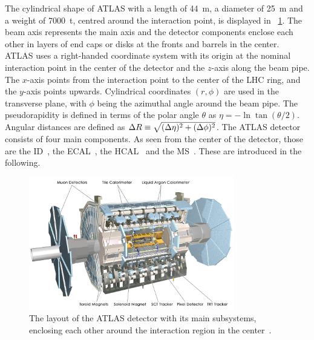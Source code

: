 %
The cylindrical shape of \gls{ATLAS} with a length of 44~m, a diameter of 25~m and a weight of 7000~t, centred around the interaction point, is displayed in \fig~\ref{fig:ATLASlayout}. The beam axis represents the main axis and the detector components enclose each other in layers of end caps or disks at the fronts and barrels in the center. 
%
\gls{ATLAS} uses a right-handed coordinate system with its origin at the nominal interaction point in the center of the detector and the $z$-axis along the beam pipe. The $x$-axis points from the interaction point to the center of the \gls{LHC} ring, and the $y$-axis points upwards.  Cylindrical coordinates $(r,\phi)$ are used in the transverse plane, with $\phi$ being the azimuthal angle around the beam pipe.  The pseudorapidity is defined in terms of the polar angle $\theta$ as $\eta = -\ln \tan(\theta/2)$.  Angular distances are defined as $\Delta R \equiv \sqrt{(\Delta\eta)^{2} + (\Delta\phi)^{2}}$.
%
The \gls{ATLAS} detector consists of four main components. As seen from the center of the detector, those are the \gls{ID}~\cite{idtdr1,idtdr2}, the \gls{ECAL}~\cite{calo,LAr}, the \gls{HCAL}~\cite{calo,Tile} and the \gls{MS}~\cite{muon1,muon2}. These are introduced in the following.
%
%
\begin{figure}[tbp!]
\centering
\includegraphics[width=0.8\textwidth]{./figs/ATLAS_full_detector.jpg}
\hfill
\caption[Layout of the \gls{ATLAS} detector]{
%
The layout of the \gls{ATLAS} detector with its main subsystems, enclosing each other around the interaction region in the center~\cite{ATLASpublic}.
%
}
\label{fig:ATLASlayout}
\end{figure}



